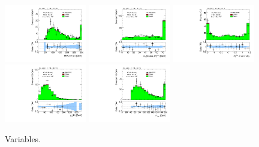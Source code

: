 \begin{figure}[tp]
  \includegraphics[width=0.32\textwidth]{figures/analysis/vbf-ZllCR/mMMC}
  \includegraphics[width=0.32\textwidth]{figures/analysis/vbf-ZllCR/mT}
  \includegraphics[width=0.32\textwidth]{figures/analysis/vbf-ZllCR/met-phi-centrality}
  \includegraphics[width=0.32\textwidth]{figures/analysis/vbf-ZllCR/H-pt-hi}
  \includegraphics[width=0.32\textwidth]{figures/analysis/vbf-ZllCR/mvis}
  \caption{Variables.}
  \label{fig:backgrounds-ZllCR-taus}
\end{figure}

